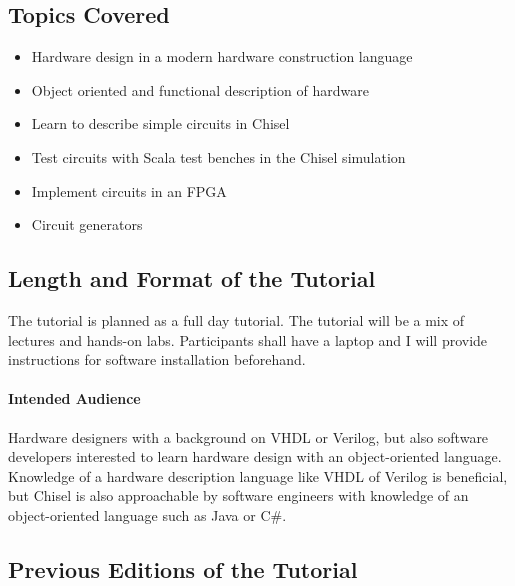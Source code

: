 \documentclass{article}
\begin{document}
\subsection*{Topics Covered}

\begin{itemize}
\item Hardware design in a modern hardware construction language
\item Object oriented and functional description of hardware
\item Learn to describe simple circuits in Chisel
\item Test circuits with Scala test benches in the Chisel simulation
\item Implement circuits in an FPGA
\item Circuit generators
\end{itemize}

\subsection*{Length and Format of the Tutorial}

The tutorial is planned as a full day tutorial.
The tutorial will be a mix of lectures and hands-on labs. Participants shall have a laptop and I will provide
instructions for software installation beforehand.



\paragraph{Intended Audience}

Hardware designers with a background on VHDL or Verilog, but also software developers
interested to learn hardware design with an object-oriented language.
Knowledge of a hardware description language like VHDL of Verilog is beneficial, but Chisel is also
approachable by software engineers with knowledge of an object-oriented language such as Java or C\#.
 

\subsection*{Previous Editions of the Tutorial}
\end{document}
